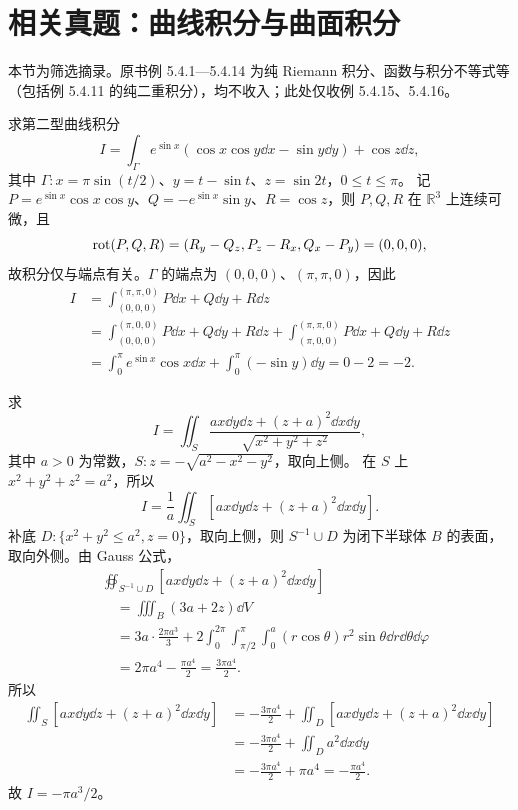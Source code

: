 \clearpage
\section{相关真题：曲线积分与曲面积分}
本节为筛选摘录。原书例 5.4.1—5.4.14 为纯 Riemann 积分、函数与积分不等式等（包括例 5.4.11 的纯二重积分），均不收入；此处仅收例 5.4.15、5.4.16。

求第二型曲线积分
\[
I=\int_\Gamma e^{\sin x}(\cos x\cos y\dd x-\sin y\dd y)+\cos z\dd z,
\]
其中 $\Gamma:x=\pi\sin(t/2)$、$y=t-\sin t$、$z=\sin2t$，$0\le t\le\pi$。
\sol 记 $P=e^{\sin x}\cos x\cos y$、$Q=-e^{\sin x}\sin y$、$R=\cos z$，则 $P,Q,R$ 在 $\mathbb R^3$ 上连续可微，且
\[
\operatorname{rot}(P,Q,R)=(R_y-Q_z,P_z-R_x,Q_x-P_y)=(0,0,0),
\]
故积分仅与端点有关。$\Gamma$ 的端点为 $(0,0,0)$、$(\pi,\pi,0)$，因此
\begin{align*}
I&=\int_{(0,0,0)}^{(\pi,\pi,0)}P\dd x+Q\dd y+R\dd z\\
&=\int_{(0,0,0)}^{(\pi,0,0)}P\dd x+Q\dd y+R\dd z
+\int_{(\pi,0,0)}^{(\pi,\pi,0)}P\dd x+Q\dd y+R\dd z\\
&=\int_0^\pi e^{\sin x}\cos x\dd x+\int_0^\pi(-\sin y)\dd y=0-2=-2.
\end{align*}

求
\[
I=\iint_S\frac{ax\dd y\dd z+(z+a)^2\dd x\dd y}{\sqrt{x^2+y^2+z^2}},
\]
其中 $a>0$ 为常数，$S:z=-\sqrt{a^2-x^2-y^2}$，取向上侧。
\sol 在 $S$ 上 $x^2+y^2+z^2=a^2$，所以
\[
I=\frac1a\iint_S[ax\dd y\dd z+(z+a)^2\dd x\dd y].
\]
补底 $D:\{x^2+y^2\le a^2,z=0\}$，取向上侧，则 $S^{-1}\cup D$ 为闭下半球体 $B$ 的表面，取向外侧。由 Gauss 公式，
\begin{align*}
&\oiint_{S^{-1}\cup D}[ax\dd y\dd z+(z+a)^2\dd x\dd y]\\
&\quad=\iiint_B(3a+2z)\dd V\\
&\quad=3a\cdot\frac{2\pi a^3}{3}
+2\int_0^{2\pi}\int_{\pi/2}^\pi\int_0^a(r\cos\theta)r^2\sin\theta\dd r\dd\theta\dd\varphi\\
&\quad=2\pi a^4-\frac{\pi a^4}{2}=\frac{3\pi a^4}{2}.
\end{align*}
所以
\begin{align*}
\iint_S[ax\dd y\dd z+(z+a)^2\dd x\dd y]
&=-\frac{3\pi a^4}{2}+\iint_D[ax\dd y\dd z+(z+a)^2\dd x\dd y]\\
&=-\frac{3\pi a^4}{2}+\iint_Da^2\dd x\dd y\\
&=-\frac{3\pi a^4}{2}+\pi a^4=-\frac{\pi a^4}{2}.
\end{align*}
故 $I=-\pi a^3/2$。
